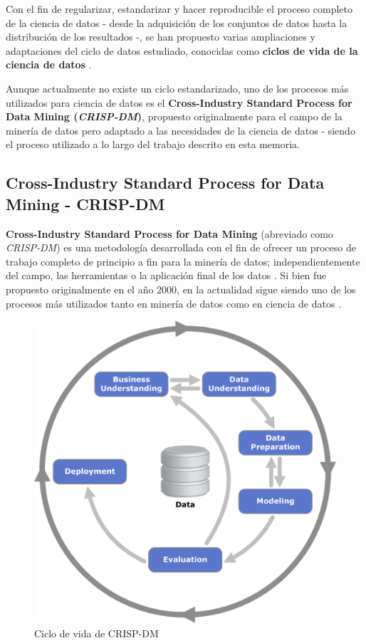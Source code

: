 Con el fin de regularizar, estandarizar y hacer reproducible el proceso completo de la ciencia de datos - desde la adquisición de los conjuntos de datos hasta la distribución de los resultados -, se han propuesto varias ampliaciones y adaptaciones del ciclo de datos estudiado, conocidas como \textbf{ciclos de vida de la ciencia de datos} \cite{datasciencelifecycle}. 

Aunque actualmente no existe un ciclo estandarizado, uno de los procesos más utilizados para ciencia de datos es el \textbf{Cross-Industry Standard Process for Data Mining (\textit{CRISP-DM})}, propuesto originalmente para el campo de la minería de datos pero adaptado a las necesidades de la ciencia de datos \cite{shearer2000crisp} - siendo el proceso utilizado a lo largo del trabajo descrito en esta memoria.

\subsection{Cross-Industry Standard Process for Data Mining - CRISP-DM}

\textbf{Cross-Industry Standard Process for Data Mining} (abreviado como \textit{CRISP-DM}) es una metodología desarrollada con el fin de ofrecer un proceso de trabajo completo de principio a fin para la minería de datos; independientemente del campo, las herramientas o la aplicación final de los datos \cite{shearer2000crisp}. Si bien fue propuesto originalmente en el año 2000, en la actualidad sigue siendo uno de los procesos más utilizados tanto en minería de datos como en ciencia de datos \cite{datasciencepmCRISPDMStill}.

\begin{figure}[h]
	\vspace{-8mm}
	\centering
	\includegraphics[width=0.5\linewidth]{figs/chapter2/crispdm}
	\captionsetup{belowskip=-15pt}
	\caption{Ciclo de vida de CRISP-DM \cite{shearer2000crisp}}
	\label{fig:crispdm}
\end{figure}

